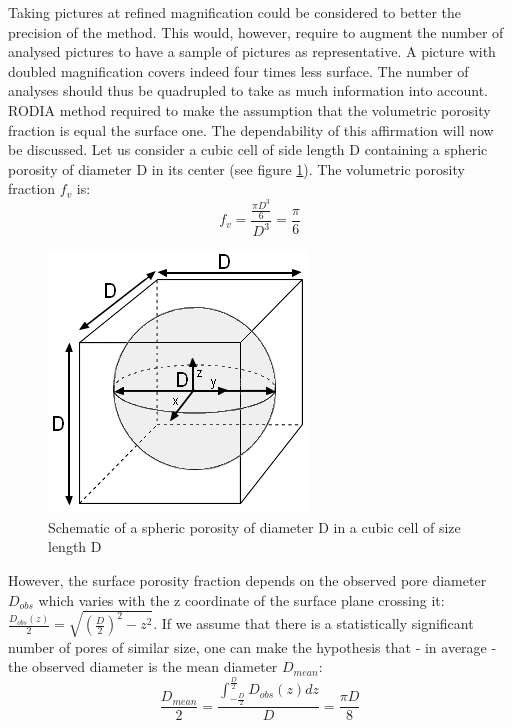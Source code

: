 Taking pictures at refined magnification could be considered to better the precision of the method. This would, however, require to augment the number of analysed pictures to have a sample of pictures as representative. A picture with doubled magnification covers indeed four times less surface. The number of analyses should thus be quadrupled to take as much information into account.\\

RODIA method required to make the assumption that the volumetric porosity fraction is equal the surface one. The dependability of this affirmation will now be discussed. Let us consider a cubic cell of side length D containing a spheric porosity of diameter D in its center (see figure \ref{fig:DDD}). The volumetric porosity fraction $f_v$ is:\\

$$f_v = \frac{\frac{\pi D^3}{6}}{D^3}= \frac{\pi}{6}$$

\begin{figure}[ht]
	\centering
	\centerline{\includegraphics[scale=0.64]{Images/DDD}}
	\decoRule
	\caption[Schematic of a spheric porosity of diameter D in a cubic cell of size length D]{Schematic of a spheric porosity of diameter D in a cubic cell of size length D}
	\label{fig:DDD}
\end{figure}

However, the surface porosity fraction depends on the observed pore diameter $D_{obs}$ which varies with the z coordinate of the surface plane crossing it: $\frac{D_{obs}(z)}{2}=\sqrt{(\frac{D}{2})^2-z^2}$. If we assume that there is a statistically significant number of pores of similar size, one can make the hypothesis that - in average - the observed diameter is the mean diameter $D_{mean}$:\\

$$ \frac{D_{mean}}{2}= \frac{\int_{-\frac{D}{2}}^\frac{D}{2} D_{obs}(z) dz}{D}=\frac{\pi D}{8}$$

